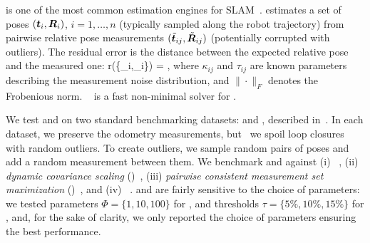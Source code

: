  \PGO is one of the most common estimation engines for SLAM~\cite{Cadena16tro-SLAMsurvey}. 
 \PGO estimates a set of poses $({\bm t}_i,{\bm R}_i)$, $i=1,\ldots,n$ (typically sampled along the robot trajectory) 
from pairwise relative pose measurements $(\tilde{{\bm t}}_{ij},\tilde{{\bm R}}_{ij})$ (potentially corrupted with outliers). 
The residual error is the distance 
between the expected relative pose and the measured one: 
\bea
r(\{\MR_i,\vt_i\}) \!
= \!,
\nonumber
\eea 
where $\kappa_{ij}$ and $\tau_{ij}$ are known parameters describing the measurement noise distribution, 
and $\|\cdot\|_F$ denotes the Frobenious norm. \sesync~\cite{Rosen18ijrr-sesync} 
 is a fast non-minimal solver for \PGO.

We test \GNCGM and \GNCTLS on two standard benchmarking datasets: \intel and \csail, described in~\cite{Rosen18ijrr-sesync}. In each dataset, we preserve the odometry measurements, but~ we spoil loop closures with random outliers. 
To create outliers, we sample random pairs of poses and add a random measurement between them.
We benchmark \GNCGM and \GNCTLS against (i) \gtwoo~\cite{Kuemmerle11icra}, 
(ii) \emph{dynamic covariance scaling} (\dcs)~\cite{Agarwal13icra}, 
(iii) \emph{pairwise consistent measurement set maximization} (\pcm)~\cite{Mangelson18icra}, 
and (iv) \adapt~\cite{Tzoumas19iros-outliers}.
\dcs and \pcm are fairly sensitive to the choice of parameters: 
  we tested parameters $\Phi =\{1,10,100\}$ for \dcs, and thresholds $\tau = \{5\%,10\%,15\%\}$ for \pcm, 
  and, for the sake of clarity, we only reported the choice of parameters ensuring the best performance.

